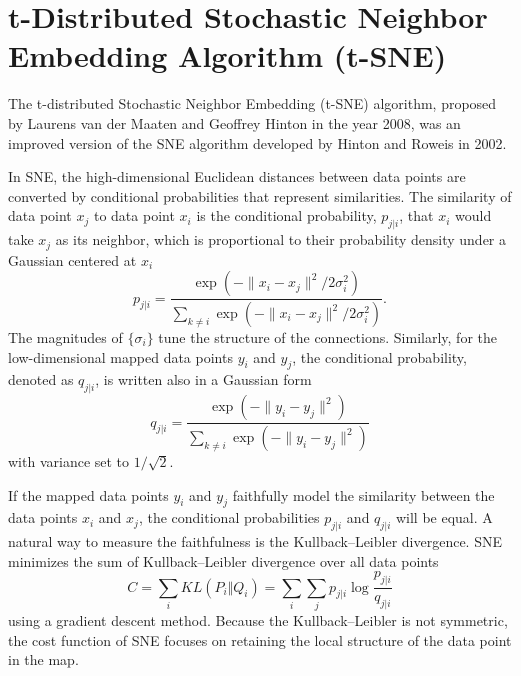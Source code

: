 \section{t-Distributed Stochastic Neighbor Embedding Algorithm (t-SNE)\label{Sec:DR:t-SNE}}
The t-distributed Stochastic Neighbor Embedding (t-SNE) algorithm, proposed by Laurens van der Maaten and Geoffrey Hinton in the year 2008,\cite{vandermaatenJMLR2008} was an improved version of the SNE algorithm developed by Hinton and Roweis in 2002.\cite{HintonNIPS2002}

In SNE, the high-dimensional Euclidean distances between data points are converted by conditional probabilities that represent similarities. The similarity of data point $x_j$ to data point $x_i$ is the conditional probability, $p_{j|i}$, that $x_i$ would take $x_j$ as its neighbor, which is proportional to their probability density under a Gaussian centered at $x_i$
\begin{equation}
	p_{j|i}=\frac{\exp{\left(-\lVert x_i-x_j\rVert^2/2\sigma_i^2\right)}}{\sum_{k\neq i}\exp{\left(-\lVert x_i-x_j\rVert^2/2\sigma_i^2\right)}}.
\end{equation}
The magnitudes of $\{\sigma_i\}$ tune the structure of the connections.
Similarly, for the low-dimensional mapped data points $y_i$ and $y_j$, the conditional probability, denoted as $q_{j|i}$, is written also in a Gaussian form
\begin{equation}
	q_{j|i}=\frac{\exp{\left(-\lVert y_i-y_j\rVert^2\right)}}{\sum_{k\neq i}\exp{\left(-\lVert y_i-y_j\rVert^2\right)}}
\end{equation}
with variance set to $1/\sqrt{2}$.

If the mapped data points $y_i$ and $y_j$ faithfully model the similarity between the data points $x_i$ and $x_j$, the conditional probabilities $p_{j|i}$ and $q_{j|i}$ will be equal. A natural way to measure the faithfulness is the Kullback--Leibler divergence. SNE minimizes the sum of Kullback--Leibler divergence over all data points
\begin{equation}
	C=\sum_i KL(P_i\Vert Q_i)=\sum_i \sum_j p_{j|i} \log{\frac{p_{j|i}}{q_{j|i}}}
\end{equation}
using a gradient descent method. Because the Kullback--Leibler is not symmetric, the cost function of SNE focuses on retaining the local structure of the data point in the map.

